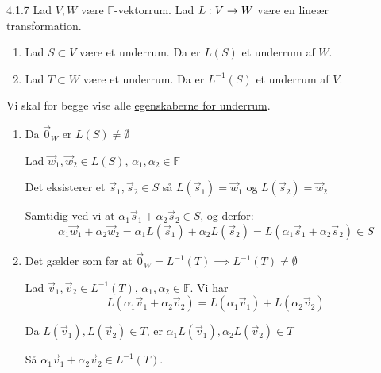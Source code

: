\begin{saetning}{4.1.7}
	Lad $V,W$ være $\mathbb{F}$-vektorrum. Lad $L: V \rightarrow W$ være en lineær
	transformation.

	\begin{enumerate}
		\item Lad $S \subset V$ være et underrum. Da er $L(S)$ et underrum af 
			$W$.
		\item Lad $T \subset W$ være et underrum. Da er $L^{-1}(S)$ et underrum
			af $V$.
	\end{enumerate}
\end{saetning}

\begin{bevis}
	Vi skal for begge vise alle
	\hyperlink{def:underrum}{egenskaberne for underrum}.
	\begin{enumerate}
		\item Da $\vec{0}_W$ er $L(S) \ne \emptyset$

			Lad $\vec{w}_1, \vec{w}_2 \in L(S)$, $\alpha_1, \alpha_2 \in \mathbb{F}$
			
			Det eksisterer et $\vec{s}_1, \vec{s}_2 \in S$ så
			$L(\vec{s}_1)=\vec{w}_1$ og $L(\vec{s}_2)=\vec{w}_2$

			Samtidig ved vi at $\alpha_1\vec{s}_1 + \alpha_2\vec{s}_2 \in S$,
			og derfor:
			$$
			\alpha_1\vec{w}_1 + \alpha_2\vec{w}_2 = \alpha_1L(\vec{s}_1) +
			\alpha_2L(\vec{s}_2) = L(\alpha_1\vec{s}_1 + \alpha_2\vec{s}_2)
			\in S
			$$
		\item Det gælder som før at $\vec{0}_W = L^{-1}(T) \implies
			L^{-1}(T) \ne \emptyset$

			Lad $\vec{v}_1, \vec{v}_2 \in L^{-1}(T)$,
			$\alpha_1, \alpha_2 \in \mathbb{F}$. Vi har
			$$ L(\alpha_1\vec{v}_1 + \alpha_2\vec{v}_2) = L(\alpha_1\vec{v}_1)
			+ L(\alpha_2\vec{v}_2) $$

			Da $L(\vec{v}_1), L(\vec{v}_2) \in T$, er $\alpha_1 L(\vec{v}_1),
			\alpha_2 L(\vec{v}_2) \in T$

			Så $\alpha_1\vec{v}_1 + \alpha_2\vec{v}_2 \in L^{-1}(T)$.
	\end{enumerate}
\end{bevis}
